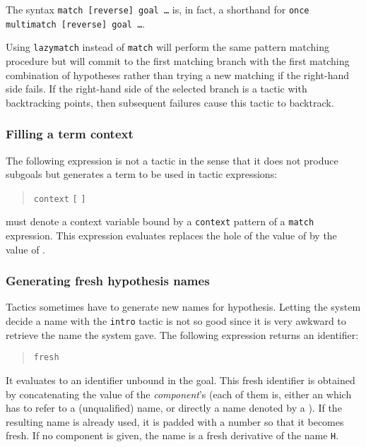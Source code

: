 The syntax {\tt match [reverse] goal \ldots} is, in fact, a shorthand for
{\tt once multimatch [reverse] goal \ldots}.

Using {\tt lazymatch} instead of {\tt match} will perform the same
pattern matching procedure but will commit to the first matching
branch with the first matching combination of hypotheses rather than
trying a new matching if the right-hand side fails. If the right-hand
side of the selected branch is a tactic with backtracking points, then
subsequent failures cause this tactic to backtrack.

\subsubsection[Filling a term context]{Filling a term context}

The following expression is not a tactic in the sense that it does not
produce subgoals but generates a term to be used in tactic
expressions:
\begin{quote}
{\tt context} {\ident} {\tt [} {\tacexpr} {\tt ]}
\end{quote}
{\ident} must denote a context variable bound by a {\tt context}
pattern of a {\tt match} expression. This expression evaluates
replaces the hole of the value of {\ident} by the value of
{\tacexpr}.

\ErrMsg {}


\subsubsection[Generating fresh hypothesis names]{Generating fresh hypothesis names
}

Tactics sometimes have to generate new names for hypothesis. Letting
the system decide a name with the {\tt intro} tactic is not so good
since it is very awkward to retrieve the name the system gave.
The following expression returns an identifier:
\begin{quote}
{\tt fresh} 
\end{quote}
It evaluates to an identifier unbound in the goal. This fresh
identifier is obtained by concatenating the value of the
\textrm{\textsl{component}}'s (each of them is, either an {\qualid} which
has to refer to a (unqualified) name, or directly a name denoted by a
{\qstring}). If the resulting name is already used, it is padded
with a number so that it becomes fresh. If no component is
given, the name is a fresh derivative of the name {\tt H}.

